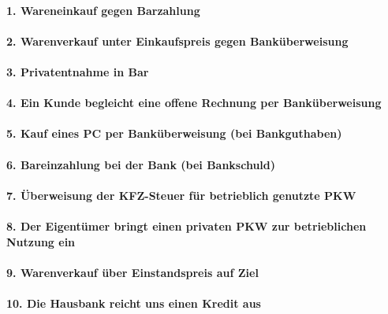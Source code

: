 \documentclass[paper=a4, fontsize=11pt]{scrartcl}
\numberwithin{equation}{section}
\numberwithin{figure}{section}
\numberwithin{table}{section}
\begin{document}
\paragraph{1. Wareneinkauf gegen Barzahlung}

\paragraph{2. Warenverkauf unter Einkaufspreis gegen Banküberweisung}

\paragraph{3. Privatentnahme in Bar}

\paragraph{4. Ein Kunde begleicht eine offene Rechnung per Banküberweisung}

\paragraph{5. Kauf eines PC per Banküberweisung (bei Bankguthaben)}

\paragraph{6. Bareinzahlung bei der Bank (bei Bankschuld)}

\paragraph{7. Überweisung der KFZ-Steuer für betrieblich genutzte PKW}

\paragraph{8. Der Eigentümer bringt einen privaten PKW zur betrieblichen Nutzung ein}

\paragraph{9. Warenverkauf über Einstandspreis auf Ziel}

\paragraph{10. Die Hausbank reicht uns einen Kredit aus}
\end{document}
